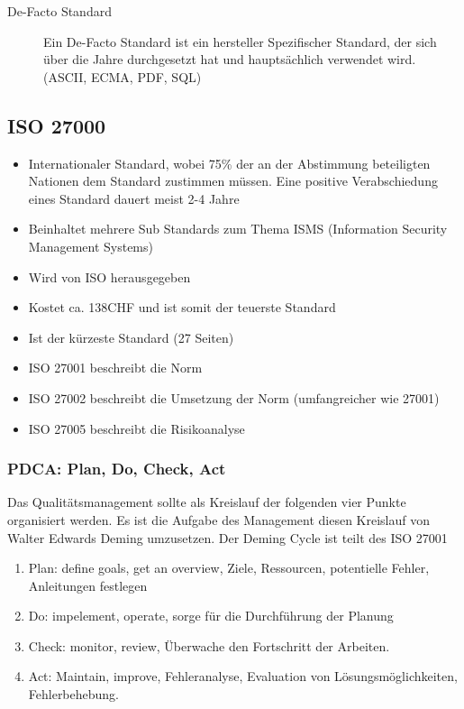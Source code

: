 \begin{description}
	\item[De-Facto Standard] Ein De-Facto Standard ist ein hersteller Spezifischer Standard, der sich über die Jahre  durchgesetzt hat und hauptsächlich verwendet wird. (ASCII, ECMA, PDF, SQL)
\end{description}

\subsection{ISO 27000}
\begin{itemize}
	\item Internationaler Standard, wobei 75\% der an der Abstimmung beteiligten Nationen dem Standard zustimmen müssen. Eine positive Verabschiedung eines Standard dauert meist 2-4 Jahre
	\item Beinhaltet mehrere Sub Standards zum Thema ISMS (Information Security Management Systems)
	\item Wird von ISO herausgegeben
	\item Kostet ca. 138CHF und ist somit der teuerste Standard
	\item Ist der kürzeste Standard (27 Seiten)
	\item ISO 27001 beschreibt die Norm 
	\item ISO 27002 beschreibt die Umsetzung der Norm (umfangreicher wie 27001)
	\item ISO 27005 beschreibt die Risikoanalyse
\end{itemize}

\subsubsection{PDCA: Plan, Do, Check, Act}
Das Qualitätsmanagement sollte als Kreislauf der folgenden vier Punkte organisiert werden. Es ist die Aufgabe des Management diesen Kreislauf von Walter Edwards Deming umzusetzen. Der Deming Cycle ist teilt des ISO 27001
\begin{enumerate}
	\item Plan: define goals, get an overview, Ziele, Ressourcen, potentielle Fehler, Anleitungen festlegen
	\item Do: impelement, operate, sorge für die Durchführung der Planung
	\item Check: monitor, review, Überwache den Fortschritt der Arbeiten.
	\item Act: Maintain, improve, Fehleranalyse, Evaluation von Lösungsmöglichkeiten, Fehlerbehebung.
\end{enumerate}

